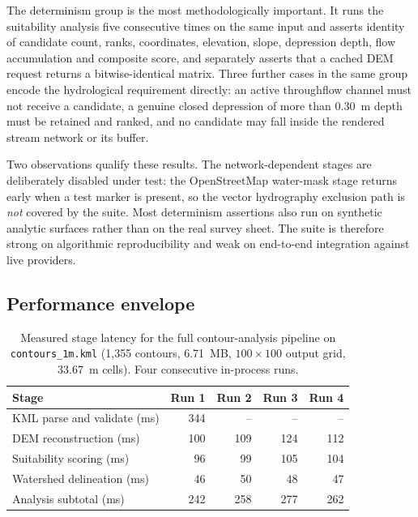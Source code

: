 \documentclass[sigconf,review,10pt]{acmart}
\begin{document}
The determinism group is the most methodologically important. It runs
the suitability analysis five consecutive times on the same input and
asserts identity of candidate count, ranks, coordinates, elevation, slope,
depression depth, flow accumulation and composite score, and separately
asserts that a cached DEM request returns a bitwise-identical matrix. Three
further cases in the same group encode the hydrological requirement
directly: an active throughflow channel must not receive a candidate, a
genuine closed depression of more than 0.30~m depth must be retained and
ranked, and no candidate may fall inside the rendered stream network or
its buffer.

Two observations qualify these results. The network-dependent stages are
deliberately disabled under test: the OpenStreetMap water-mask stage
returns early when a test marker is present, so the vector hydrography
exclusion path is \emph{not} covered by the suite. Most determinism
assertions also run on synthetic analytic surfaces rather than on the real
survey sheet. The suite is therefore strong on algorithmic
reproducibility and weak on end-to-end integration against live providers.

\subsection{Performance envelope}

\begin{table}[t]
\caption{Measured stage latency for the full contour-analysis pipeline on
\texttt{contours\_1m.kml} (1,355 contours, 6.71~MB, $100\times100$ output
grid, 33.67~m cells). Four consecutive in-process runs.}
\label{tab:perf}
\small
\setlength{\tabcolsep}{4.5pt}
\begin{tabular}{@{}lrrrr@{}}
\toprule
\textbf{Stage} & \textbf{Run 1} & \textbf{Run 2} & \textbf{Run 3} & \textbf{Run 4} \\
\midrule
KML parse and validate (ms)      & 344 & -- & -- & -- \\
DEM reconstruction (ms)          & 100 & 109 & 124 & 112 \\
Suitability scoring (ms)         & 96 & 99 & 105 & 104 \\
Watershed delineation (ms)       & 46 & 50 & 48 & 47 \\
\midrule
Analysis subtotal (ms)           & 242 & 258 & 277 & 262 \\
\end{tabular}
\end{table}
\end{document}
